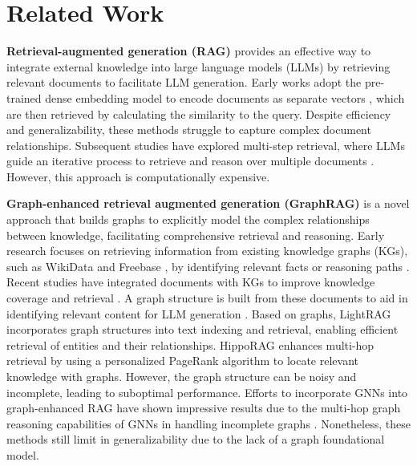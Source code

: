 \section{Related Work}
\noindent\textbf{Retrieval-augmented generation (RAG)} \citep{gao2023retrieval} provides an effective way to integrate external knowledge into large language models (LLMs) by retrieving relevant documents to facilitate LLM generation. Early works adopt the pre-trained dense embedding model to encode documents as separate vectors \citep{karpukhin2020dense,bge_m3,li2023towards,moreira2024nv}, which are then retrieved by calculating the similarity to the query. Despite efficiency and generalizability, these methods struggle to capture complex document relationships. Subsequent studies have explored multi-step retrieval, where LLMs guide an iterative process to retrieve and reason over multiple documents \citep{trivedi2023interleaving,jiang2023active,su-etal-2024-dragin}. However, this approach is computationally expensive. 

\noindent\textbf{Graph-enhanced retrieval augmented generation (GraphRAG)} \citep{peng2024graph,han2024retrieval} is a novel approach that builds graphs to explicitly model the complex relationships between knowledge, facilitating comprehensive retrieval and reasoning. Early research focuses on retrieving information from existing knowledge graphs (KGs), such as WikiData \citep{vrandevcic2014wikidata} and Freebase \citep{bollacker2008freebase}, by identifying relevant facts or reasoning paths \citep{li2023graph,luoreasoning,panda2024holmes}. Recent studies have integrated documents with KGs to improve knowledge coverage and retrieval \citep{edge2024local,liang2024kag}. A graph structure is built from these documents to aid in identifying relevant content for LLM generation \citep{dong2024don}. Based on graphs, LightRAG \citep{guo2024lightrag} incorporates graph structures into text indexing and retrieval, enabling efficient retrieval of entities and their relationships.
HippoRAG \citep{gutiérrez2024hipporag} enhances multi-hop retrieval by using a personalized PageRank algorithm to locate relevant knowledge with graphs. However, the graph structure can be noisy and incomplete, leading to suboptimal performance. Efforts to incorporate GNNs into graph-enhanced RAG \citep{mavromatis2024gnn,he2024g} have shown impressive results due to the multi-hop graph reasoning capabilities of GNNs in handling incomplete graphs \citep{yasunaga2021qa}. Nonetheless, these methods still limit in generalizability due to the lack of a graph foundational model.

